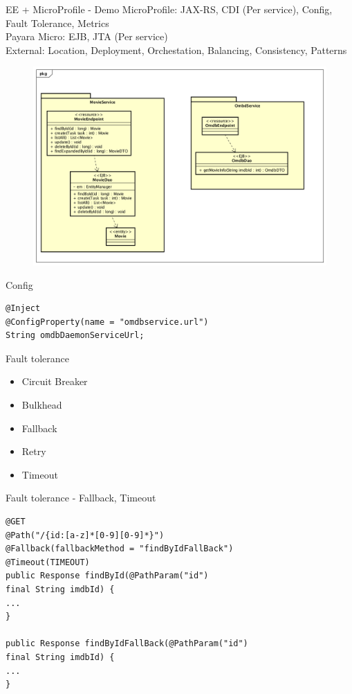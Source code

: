 \documentclass{beamer}
\begin{document}
\begin{frame}{EE + MicroProfile - Demo}
\footnotesize MicroProfile: JAX-RS, CDI (Per service), Config, Fault Tolerance, Metrics\\
Payara Micro: EJB, JTA (Per service)\\
External: Location, Deployment, Orchestation, Balancing, Consistency, Patterns
\begin{figure}
\centering
\includegraphics[width=0.95\linewidth]{Images/demomicro}
\end{figure}

\end{frame}

\begin{frame}[fragile]{Config}
\begin{lstlisting}
@Inject
@ConfigProperty(name = "omdbservice.url")
String omdbDaemonServiceUrl;
\end{lstlisting}
\end{frame}

\begin{frame}{Fault tolerance}

\begin{itemize}
\item Circuit Breaker
\item Bulkhead
\item Fallback
\item Retry
\item Timeout
\end{itemize}

\end{frame}


\begin{frame}[fragile]{Fault tolerance - Fallback, Timeout}
\begin{lstlisting}
@GET
@Path("/{id:[a-z]*[0-9][0-9]*}")
@Fallback(fallbackMethod = "findByIdFallBack")
@Timeout(TIMEOUT)
public Response findById(@PathParam("id") 
final String imdbId) {
...
}

public Response findByIdFallBack(@PathParam("id") 
final String imdbId) {
...
}
\end{lstlisting}
\end{frame}
\end{document}
